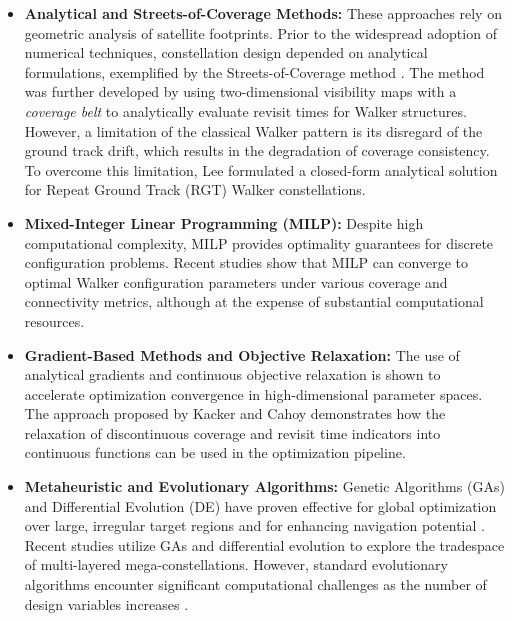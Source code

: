 \begin{itemize}
    \item \textbf{Analytical and Streets-of-Coverage Methods:} These approaches rely on geometric analysis of satellite footprints. Prior to the widespread adoption of numerical techniques, constellation design depended on analytical formulations, exemplified by the Streets-of-Coverage method \cite{luders1961}. The method was further developed \cite{ulybyshev2014} by using two-dimensional visibility maps with a \textit{coverage belt} to analytically evaluate revisit times for Walker structures. However, a limitation of the classical Walker pattern is its disregard of the ground track drift, which results in the degradation of coverage consistency. To overcome this limitation, Lee \cite{lee2023} formulated a closed-form analytical solution for Repeat Ground Track (RGT) Walker constellations.

    \item \textbf{Mixed-Integer Linear Programming (MILP):} Despite high computational complexity, MILP provides optimality guarantees for discrete configuration problems. Recent studies \cite{williamsRogersEtAl_JSR_2025} show that MILP can converge to     optimal Walker configuration parameters under various coverage and connectivity metrics, although at the expense of substantial computational resources.

    \item \textbf{Gradient-Based Methods and Objective Relaxation:} The use of analytical gradients and continuous objective relaxation is shown to accelerate optimization convergence in high-dimensional parameter spaces. The approach proposed by Kacker and Cahoy \cite{kacker2026} demonstrates how the relaxation of discontinuous coverage and revisit time indicators into continuous functions can be used in the optimization pipeline.


    \item \textbf{Metaheuristic and Evolutionary Algorithms:} Genetic Algorithms (GAs) and Differential Evolution (DE) have proven effective for global optimization over large, irregular target regions \cite{gu2025} and for enhancing navigation potential \cite{whittecar2014}. Recent studies \cite{gu2025,wang2025dnsde} utilize GAs and differential evolution to explore the tradespace of multi-layered mega-constellations. However, standard evolutionary algorithms encounter significant computational challenges as the number of design variables increases .
\end{itemize}


